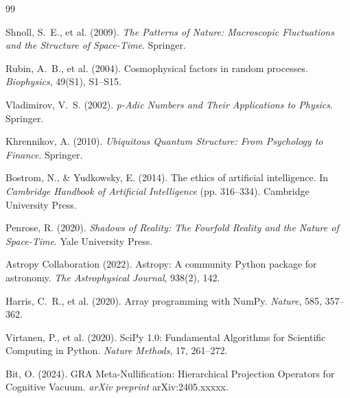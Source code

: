 \documentclass[12pt,a4paper]{article}
\theoremstyle{plain}
\theoremstyle{definition}
\theoremstyle{remark}
\begin{document}
\begin{thebibliography}{99}

Shnoll, S.~E., et al. (2009).
\newblock \emph{The Patterns of Nature: Macroscopic Fluctuations and the Structure of Space-Time}.
\newblock Springer.

Rubin, A.~B., et al. (2004).
\newblock Cosmophysical factors in random processes.
\newblock \emph{Biophysics}, 49(S1), S1--S15.

Vladimirov, V.~S. (2002).
\newblock \emph{p-Adic Numbers and Their Applications to Physics}.
\newblock Springer.

Khrennikov, A. (2010).
\newblock \emph{Ubiquitous Quantum Structure: From Psychology to Finance}.
\newblock Springer.

Bostrom, N., \& Yudkowsky, E. (2014).
\newblock The ethics of artificial intelligence.
\newblock In \emph{Cambridge Handbook of Artificial Intelligence} (pp. 316--334). Cambridge University Press.

Penrose, R. (2020).
\newblock \emph{Shadows of Reality: The Fourfold Reality and the Nature of Space-Time}.
\newblock Yale University Press.

Astropy Collaboration (2022).
\newblock Astropy: A community Python package for astronomy.
\newblock \emph{The Astrophysical Journal}, 938(2), 142.

Harris, C.~R., et al. (2020).
\newblock Array programming with NumPy.
\newblock \emph{Nature}, 585, 357--362.

Virtanen, P., et al. (2020).
\newblock SciPy 1.0: Fundamental Algorithms for Scientific Computing in Python.
\newblock \emph{Nature Methods}, 17, 261--272.

Bit, O. (2024).
\newblock GRA Meta-Nullification: Hierarchical Projection Operators for Cognitive Vacuum.
\newblock \emph{arXiv preprint} arXiv:2405.xxxxx.

\end{thebibliography}

\end{document}
